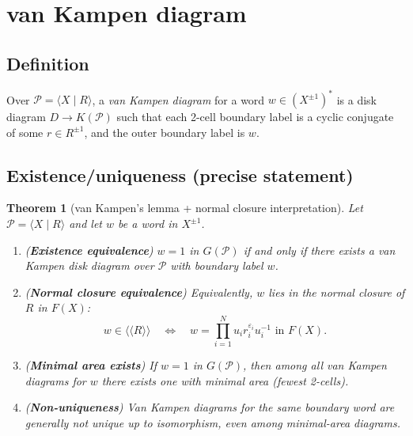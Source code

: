 \documentclass[11pt]{article}
\newtheorem{theorem}{Theorem}[section]
\theoremstyle{definition}
\theoremstyle{plain}
\theoremstyle{remark}
\begin{document}
\section{van Kampen diagram}

\subsection*{Definition}
Over $\mathcal P=\langle X\mid R\rangle$, a \emph{van Kampen diagram} for a word $w\in (X^{\pm1})^*$ is a disk diagram $D\to K(\mathcal P)$
such that each 2-cell boundary label is a cyclic conjugate of some $r\in R^{\pm1}$, and the outer boundary label is $w$.

\subsection*{Existence/uniqueness (precise statement)}
\begin{theorem}[van Kampen's lemma + normal closure interpretation]\label{thm:vK}
Let $\mathcal P=\langle X\mid R\rangle$ and let $w$ be a word in $X^{\pm1}$.
\begin{enumerate}[leftmargin=2.2em]
\item (\textbf{Existence equivalence}) $w=1$ in $G(\mathcal P)$ if and only if there exists a van Kampen disk diagram over $\mathcal P$ with boundary label $w$.
\item (\textbf{Normal closure equivalence}) Equivalently, $w$ lies in the normal closure of $R$ in $F(X)$:
\[
w\in \langle\!\langle R\rangle\!\rangle \quad\Longleftrightarrow\quad
w=\prod_{i=1}^N u_i r_i^{\varepsilon_i}u_i^{-1}\text{ in }F(X).
\]
\item (\textbf{Minimal area exists}) If $w=1$ in $G(\mathcal P)$, then among all van Kampen diagrams for $w$ there exists one with minimal area (fewest 2-cells).
\item (\textbf{Non-uniqueness}) Van Kampen diagrams for the same boundary word are generally not unique up to isomorphism, even among minimal-area diagrams.
\end{enumerate}
\end{theorem}
\end{document}
